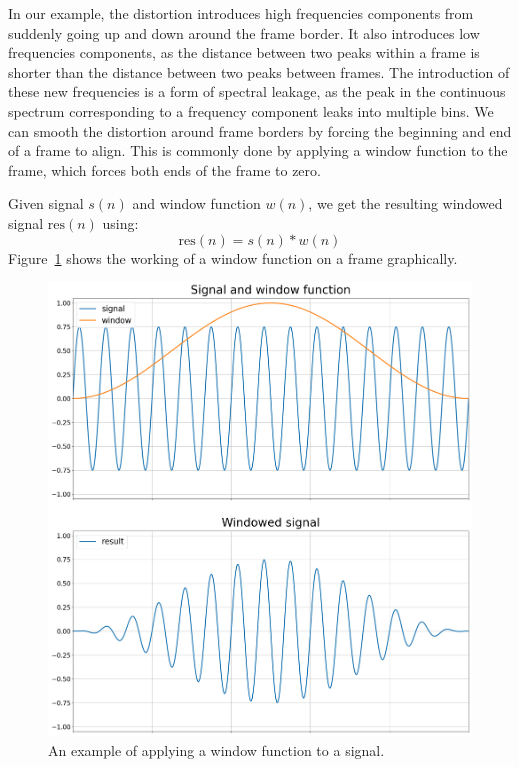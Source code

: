 \documentclass[a4paper,10pt,twocolumn]{article}
\begin{document}
In our example, the distortion introduces high frequencies components from suddenly going up and down around the frame border. It also introduces low frequencies components, as the distance between two peaks within a frame is shorter than the distance between two peaks between frames. The introduction of these new frequencies is a form of spectral leakage, as the peak in the continuous spectrum corresponding to a frequency component leaks into multiple bins. We can smooth the distortion around frame borders by forcing the beginning and end of a frame to align. This is commonly done by applying a window function to the frame, which forces both ends of the frame to zero.

Given signal $s(n)$ and window function $w(n)$, we get the resulting windowed signal $\text{res}(n)$ using:
\[ \text{res}(n) = s(n) * w(n) \]
Figure~\ref{fig:windowfunc} shows the working of a window function on a frame graphically.
\begin{figure}[b!]
    \centering
    \includegraphics[width=\linewidth]{fig/window.png}
    \caption{An example of applying a window function to a signal.}
    \label{fig:windowfunc}
\end{figure}
\end{document}

